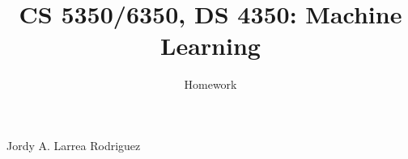 \documentclass[12pt, fullpage,letterpaper]{article}
\title{CS 5350/6350, DS 4350: Machine Learning \semester}
\author{Homework \assignmentId}
\begin{document}
\maketitle
\begin{center}
	Jordy A. Larrea Rodriguez
\end{center}

\end{document}
